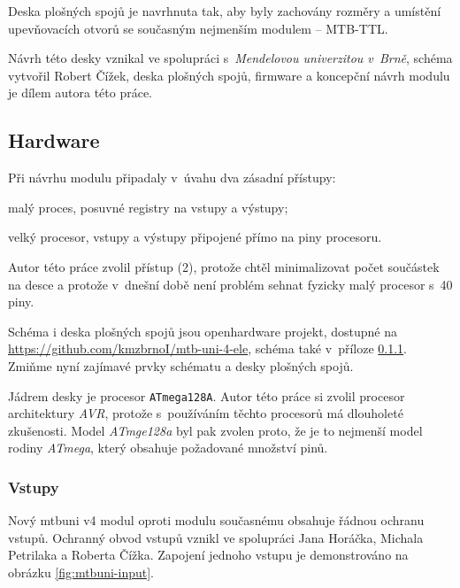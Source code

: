 Deska plošných spojů je navrhnuta tak, aby byly zachovány rozměry a umístění
upevňovacích otvorů se současným nejmenším modulem – MTB-TTL.

Návrh této desky vznikal ve spolupráci s~\textit{Mendelovou univerzitou v~Brně},
schéma vytvořil Robert Čížek, deska plošných spojů, firmware a koncepční návrh
modulu je dílem autora této práce.


\subsection{Hardware}

Při návrhu modulu připadaly v~úvahu dva zásadní přístupy:

\begin{compactenum}
\item malý proces, posuvné registry na vstupy a výstupy;
\item velký procesor, vstupy a výstupy připojené přímo na piny procesoru.
\end{compactenum}

Autor této práce zvolil přístup (2), protože chtěl minimalizovat počet
součástek na desce a protože v~dnešní době není problém sehnat fyzicky malý
procesor s~40 piny.

Schéma i deska plošných spojů jsou openhardware projekt, dostupné na
\url{https://github.com/kmzbrnoI/mtb-uni-4-ele}, schéma také v~příloze
\ref{}. Zmiňme nyní zajímavé prvky schématu a desky plošných spojů.

Jádrem desky je procesor \texttt{ATmega128A}. Autor této práce si zvolil
procesor architektury \textit{AVR}, protože s~používáním těchto procesorů má
dlouholeté zkušenosti. Model \textit{ATmge128a} byl pak zvolen proto, že je to
nejmenší model rodiny \textit{ATmega}, který obsahuje požadované množství pinů.

\subsubsection{Vstupy}

Nový \gls{mtbuni} v4 modul oproti modulu současnému obsahuje řádnou ochranu
vstupů. Ochranný obvod vstupů vznikl ve spolupráci Jana Horáčka, Michala
Petrilaka a Roberta Čížka. Zapojení jednoho vstupu je demonstrováno na obrázku
\ref{fig:mtbuni-input}.

